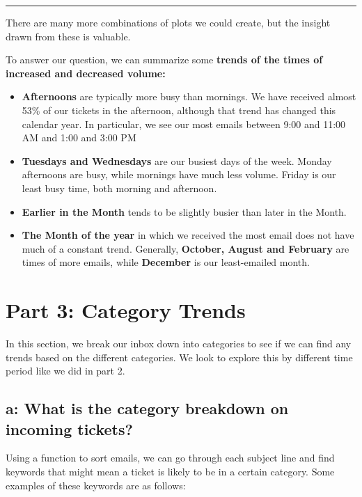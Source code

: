 \documentclass[11pt]{article}
\begin{document}
    \begin{center}\rule{0.5\linewidth}{\linethickness}\end{center}

There are many more combinations of plots we could create, but the
insight drawn from these is valuable.

To answer our question, we can summarize some \textbf{trends of the
times of increased and decreased volume:}

\begin{itemize}
\item
  \textbf{Afternoons} are typically more busy than mornings. We have
  received almost 53\% of our tickets in the afternoon, although that
  trend has changed this calendar year. In particular, we see our most
  emails between 9:00 and 11:00 AM and 1:00 and 3:00 PM 
\item
  \textbf{Tuesdays and Wednesdays} are our busiest days of the week.
  Monday afternoons are busy, while mornings have much less volume.
  Friday is our least busy time, both morning and afternoon. 
\item
  \textbf{Earlier in the Month} tends to be slightly busier than later
  in the Month. 
\item
  \textbf{The Month of the year} in which we received the most email
  does not have much of a constant trend. Generally, \textbf{October,
  August and February} are times of more emails, while \textbf{December}
  is our least-emailed month.
\end{itemize}

    \hypertarget{part-3-category-trends}{%
\section{Part 3: Category Trends}\label{part-3-category-trends}}

In this section, we break our inbox down into categories to see if we
can find any trends based on the different categories. We look to
explore this by different time period like we did in part 2.

\hypertarget{a-what-is-the-category-breakdown-on-incoming-tickets}{%
\subsection{a: What is the category breakdown on incoming
tickets?}\label{a-what-is-the-category-breakdown-on-incoming-tickets}}

    Using a function to sort emails, we can go through each subject line and
find keywords that might mean a ticket is likely to be in a certain
category. Some examples of these keywords are as follows:
\end{document}
